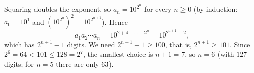 Squaring doubles the exponent, so $a_n=10^{2^n}$ for every $n\ge0$ (by induction: $a_0=10^1$ and $\left(10^{2^n}\right)^2=10^{2^{n+1}}$). Hence
\[a_1a_2\cdots a_n=10^{2+4+\cdots+2^n}=10^{2^{n+1}-2},\]
which has $2^{n+1}-1$ digits. We need $2^{n+1}-1\ge100$, that is, $2^{n+1}\ge101$. Since $2^6=64<101\le128=2^7$, the smallest choice is $n+1=7$, so $n=\boxed{6}$ (with $127$ digits; for $n=5$ there are only $63$).

